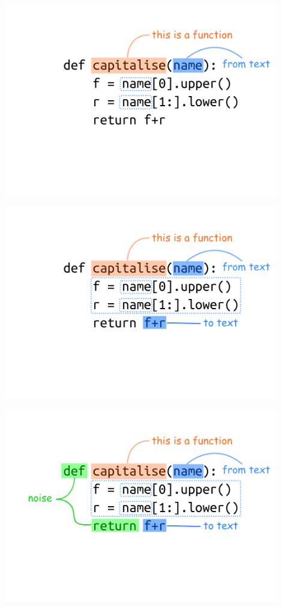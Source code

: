 \documentclass[xcolor={table}]{beamer}
\begin{document}
\begin{frame}{}{}

    \centering
    \includegraphics[width=0.9\textwidth]{images/python-code-03.png}

\end{frame}

\begin{frame}{}{}

    \centering
    \includegraphics[width=0.9\textwidth]{images/python-code-04.png}

\end{frame}

\begin{frame}{}{}

    \centering
    \includegraphics[width=0.9\textwidth]{images/python-code-05.png}

\end{frame}
\end{document}
